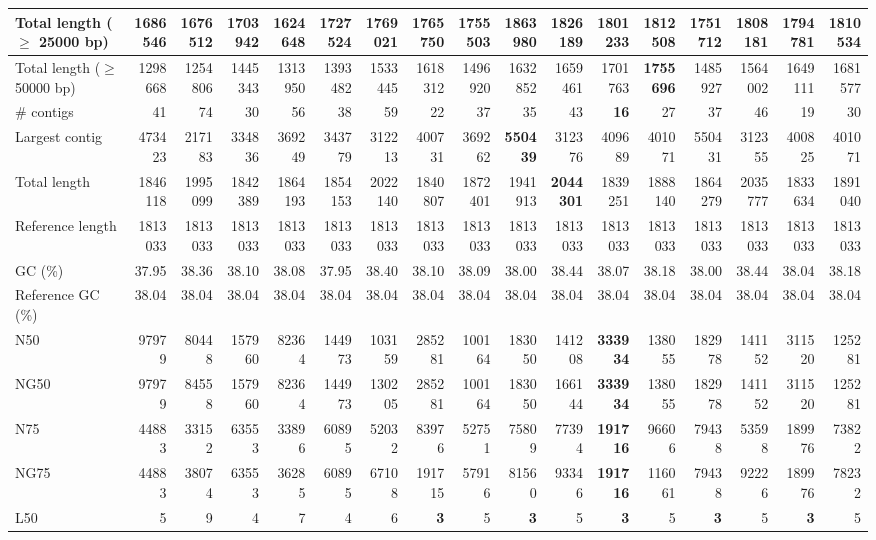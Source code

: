 \documentclass[12pt,a4paper]{article}
\begin{document}
\begin{table}[ht]
\begin{center}
\begin{tabular}{|l*{16}{|r}|}
Total length ($\geq$ 25000 bp) & 1686546 & 1676512 & 1703942 & 1624648 & 1727524 & 1769021 & 1765750 & 1755503 & {\bf 1863980} & 1826189 & 1801233 & 1812508 & 1751712 & 1808181 & 1794781 & 1810534 \\ \hline
Total length ($\geq$ 50000 bp) & 1298668 & 1254806 & 1445343 & 1313950 & 1393482 & 1533445 & 1618312 & 1496920 & 1632852 & 1659461 & 1701763 & {\bf 1755696} & 1485927 & 1564002 & 1649111 & 1681577 \\ \hline
\# contigs & 41 & 74 & 30 & 56 & 38 & 59 & 22 & 37 & 35 & 43 & {\bf 16} & 27 & 37 & 46 & 19 & 30 \\ \hline
Largest contig & 473423 & 217183 & 334836 & 369249 & 343779 & 312213 & 400731 & 369262 & {\bf 550439} & 312376 & 409689 & 401071 & 550431 & 312355 & 400825 & 401071 \\ \hline
Total length & 1846118 & 1995099 & 1842389 & 1864193 & 1854153 & 2022140 & 1840807 & 1872401 & 1941913 & {\bf 2044301} & 1839251 & 1888140 & 1864279 & 2035777 & 1833634 & 1891040 \\ \hline
Reference length & 1813033 & 1813033 & 1813033 & 1813033 & 1813033 & 1813033 & 1813033 & 1813033 & 1813033 & 1813033 & 1813033 & 1813033 & 1813033 & 1813033 & 1813033 & 1813033 \\ \hline
GC (\%) & 37.95 & 38.36 & 38.10 & 38.08 & 37.95 & 38.40 & 38.10 & 38.09 & 38.00 & 38.44 & 38.07 & 38.18 & 38.00 & 38.44 & 38.04 & 38.18 \\ \hline
Reference GC (\%) & 38.04 & 38.04 & 38.04 & 38.04 & 38.04 & 38.04 & 38.04 & 38.04 & 38.04 & 38.04 & 38.04 & 38.04 & 38.04 & 38.04 & 38.04 & 38.04 \\ \hline
N50 & 97979 & 80448 & 157960 & 82364 & 144973 & 103159 & 285281 & 100164 & 183050 & 141208 & {\bf 333934} & 138055 & 182978 & 141152 & 311520 & 125281 \\ \hline
NG50 & 97979 & 84558 & 157960 & 82364 & 144973 & 130205 & 285281 & 100164 & 183050 & 166144 & {\bf 333934} & 138055 & 182978 & 141152 & 311520 & 125281 \\ \hline
N75 & 44883 & 33152 & 63553 & 33896 & 60895 & 52032 & 83976 & 52751 & 75809 & 77394 & {\bf 191716} & 96606 & 79438 & 53598 & 189976 & 73822 \\ \hline
NG75 & 44883 & 38074 & 63553 & 36285 & 60895 & 67108 & 191715 & 57916 & 81560 & 93346 & {\bf 191716} & 116061 & 79438 & 92226 & 189976 & 78232 \\ \hline
L50 & 5 & 9 & 4 & 7 & 4 & 6 & {\bf 3} & 5 & {\bf 3} & 5 & {\bf 3} & 5 & {\bf 3} & 5 & {\bf 3} & 5 \\ \hline

\end{tabular}
\end{center}
\end{table}
\end{document}
